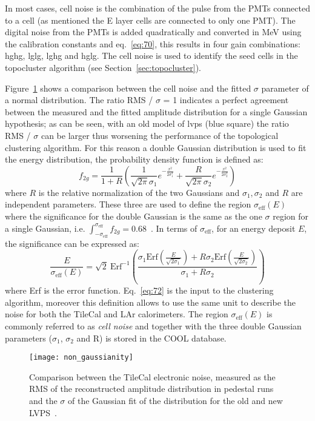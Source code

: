 In most cases, cell noise is the combination of the pulse from the PMTs
connected to a cell (as mentioned the E layer cells are connected to only one
PMT). The digital noise from the PMTs is added quadratically and converted in
MeV using the calibration constants and eq.~\eqref{eq:70}, this results in four
gain combinations: \gls{hghg}, \gls{lglg}, \gls{lghg} and \gls{hglg}. The cell
noise is used to identify the seed cells in the topocluster algorithm (see
Section~\ref{sec:topocluster}).

Figure~\ref{fig:non_gaussianity} shows a comparison between the cell noise and
the fitted $\sigma$ parameter of a normal distribution. The ratio RMS / $\sigma$
= 1 indicates a perfect agreement between the measured and the fitted amplitude
distribution for a single Gaussian hypothesis; as can be seen, with an old model
of \gls{lvps} (blue square) the ratio RMS / $\sigma$ can be larger thus
worsening the performance of the topological clustering algorithm. For this
reason a double Gaussian distribution is used to fit the energy distribution,
the probability density function is defined as:
\begin{equation}
  \label{eq:71}
  f_{2g} = \frac{1}{1 + R} \left( \frac{1}{\sqrt{2 \pi} \sigma_1} e^{-
      \frac{x^2}{2 \sigma_1^2}} + \frac{R}{\sqrt{2 \pi} \sigma_2} e^{-
      \frac{x^2}{2 \sigma_2^2}} \right)
\end{equation}
where $R$ is the relative normalization of the two Gaussians and
$\sigma_1, \sigma_2$ and $R$ are independent parameters. These three are used to
define the region $\sigma_{\text{eff}}(E)$ where the significance for the double
Gaussian is the same as the one $\sigma$ region for a single Gaussian,
i.e.
$\int_{- \sigma_{\text{eff}}}^{\sigma_{\text{eff}}} f_{2g} =
0.68$~\cite{TileReadiness}.
In terms of $\sigma_{\text{eff}}$, for an energy deposit $E$, the significance
can be expressed as:
\begin{equation}
  \label{eq:72}
  \frac{E}{\sigma_{\text{eff}}(E)} = \sqrt{2}\ \text{Erf}^{- 1} \left( \frac{\sigma_1
      \text{Erf} \left(\frac{E}{\sqrt{2 \sigma_1}} \right) + R \sigma_2 \text{Erf}
    \left( \frac{E}{\sqrt{2 \sigma_2}} \right)}{\sigma_1 + R \sigma_2} \right)
\end{equation}
where Erf is the error function. Eq.~\eqref{eq:72} is the input to the
clustering algorithm, moreover this definition allows to use the same unit to
describe the noise for both the TileCal and LAr calorimeters. The region
$\sigma_{\text{eff}}(E)$ is commonly referred to as \emph{cell noise} and
together with the three double Gaussian parameters ($\sigma_1$, $\sigma_2$ and
R) is stored in the COOL database.

\begin{figure}[!h]
  \centering
    \texttt{[image: non\_gaussianity]}
    \caption{Comparison between the TileCal electronic noise, measured as the
      RMS of the reconstructed amplitude distribution in pedestal runs and the
      $\sigma$ of the Gaussian fit of the distribution for the old and new
      LVPS~\cite{TileCalNoisePub}.}
    \label{fig:non_gaussianity}
\end{figure}
